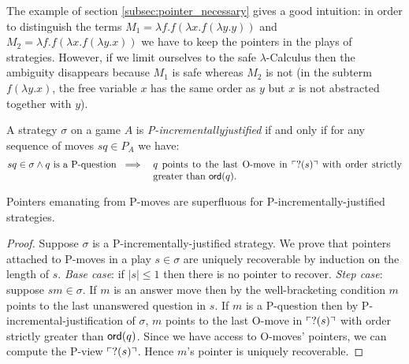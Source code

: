 The example of section \ref{subsec:pointer_necessary} gives a good
intuition: in order to distinguish the terms $M_1 = \lambda f . f
(\lambda x . f (\lambda y .y ))$ and $M_2 = \lambda f . f (\lambda x
. f (\lambda y .x ))$ we have to keep the pointers in the plays of
strategies. However, if we limit ourselves to the safe
$\lambda$-Calculus then the ambiguity disappears because $M_1$ is
safe whereas $M_2$ is not (in the subterm $f (\lambda y . x)$, the
free variable $x$ has the same order as $y$ but $x$ is not
abstracted together with $y$).

\begin{dfn}
A strategy $\sigma$ on a game $A$ is
\emph{P-incrementally\-justified} if and only if for any sequence of
moves $s q \in P_A$ we have:
\begin{eqnarray*}
s q \in \sigma \wedge q \mbox{ is a P-question } &\implies&
\parbox[t]{9cm}{$q$  points to the last O-move in $\pview{?(s)}$
with order strictly greater than $\ord{q}$.}
\end{eqnarray*}
\end{dfn}

\begin{lem}
\label{lem:incrjustified_pointers_uniqu_recover} Pointers emanating from P-moves are
superfluous for P-incrementally-justified strategies.
\end{lem}
\begin{proof}
Suppose $\sigma$ is a P-incrementally-justified strategy. We prove that pointers attached to P-moves in a play $s\in \sigma$ are uniquely recoverable by induction on the length of $s$. \noindent \emph{Base case}: if $|s| \leq 1$ then there is no pointer to recover.
\noindent \emph{Step case}: suppose $s m \in \sigma$. If $m$ is an answer move then by the well-bracketing condition $m$ points
to the last unanswered question in $s$. If $m$ is a P-question then by  P-incremental-justification of $\sigma$, $m$ points to the last O-move in
$\ulcorner ?(s) \urcorner$ with order strictly greater than ${\sf ord}(q)$. Since we have access to O-moves' pointers, we can compute the P-view $\ulcorner ?(s) \urcorner$.
Hence $m$'s pointer is uniquely recoverable.
\end{proof}


